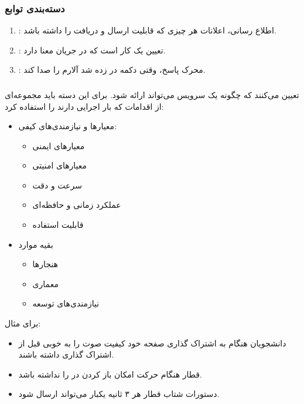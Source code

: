 \subsubsection*{دسته‌بندی توابع}

\begin{enumerate}
    \item {}: اطلاع رسانی، اعلانات هر چیزی که قابلیت ارسال و
    دریافت را داشته باشد.
    \item {}: تعیین  یک کار است که در جریان معنا دارد.
    \item {}: محرک پاسخ، وقتی دکمه در  زده شد آلارم را
    صدا کند.
\end{enumerate}

\subsubsection{}

تعیین می‌کنند که چگونه یک سرویس می‌تواند ارائه شود. برای این دسته باید مجموعه‌ای
از اقدامات که بار اجرایی دارند را استفاده کرد:

\begin{itemize}
    \item معیار‌ها و نیازمندی‌های کیفی:
    \begin{itemize}
        \item معیار‌های ایمنی
        \item معیار‌‌های امنیتی
        \item سرعت و دقت
        \item عملکرد زمانی و حافظه‌ای
        \item قابلیت استفاده
    \end{itemize}
    \item بقیه موارد
    \begin{itemize}
        \item هنجار‌ها
        \item معماری
        \item نیازمندی‌های توسعه 
    \end{itemize}
\end{itemize}

برای مثال:

\begin{itemize}
    \item دانشجویان هنگام به اشتراک گذاری صفحه خود کیفیت صوت را به خوبی قبل از
    اشتراک گذاری داشته باشند.
    \item قطار هنگام حرکت امکان باز کردن در را نداشته باشد.
    \item دستورات شتاب قطار هر ۳ ثانیه یکبار می‌تواند ارسال شود.
\end{itemize}


